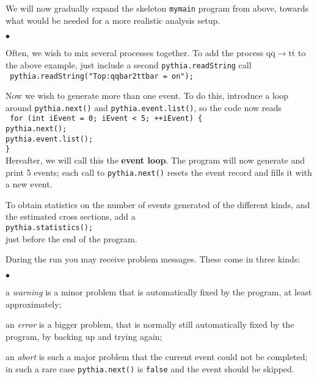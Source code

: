 \documentclass[12pt,a4paper]{article}
\newcommand{\q}{{\mathrm q}}
\renewcommand{\t}{{\mathrm t}}
\newcommand{\qbar}{\overline{\mathrm q}}
\newcommand{\tbar}{\overline{\mathrm t}}
\newenvironment{Itemize}{\begin{list}{$\bullet$}%
{\setlength{\topsep}{0.4mm}\setlength{\partopsep}{0.4mm}%
\setlength{\itemsep}{0.4mm}\setlength{\parsep}{0.4mm}}}%
{\end{list}}
\begin{document}
We will now gradually expand the skeleton \texttt{mymain} program from
above, towards what would be needed for a more realistic analysis setup.
\begin{Itemize}
\item Often, we wish to mix several processes together. 
To add the process $\q \qbar \to \t \tbar$ to the above example, 
just include a second \texttt{pythia.readString} call\\
\texttt{
\hspace*{10mm} pythia.readString("Top:qqbar2ttbar = on");
}
\item Now we wish to generate more than one event. To do this, introduce a
loop around \texttt{pythia.next()} and \texttt{pythia.event.list()}, so the
code now reads\\
\texttt{
\hspace*{10mm} for (int iEvent = 0; iEvent < 5; ++iEvent) \{ \\
\hspace*{15mm}   pythia.next(); \\
\hspace*{15mm}   pythia.event.list(); \\
\hspace*{10mm} \} } \\
Hereafter, we will call this the \textbf{event loop}. The program will
now generate and print 5 events; each call to \texttt{pythia.next()} 
resets the event record and fills it with a new event. 
\item To obtain statistics on the number of events generated of the 
different kinds, and the estimated cross sections, add a \\
\hspace*{10mm}\texttt{pythia.statistics();}\\
just before the end of the program.
\item During the run you may receive problem messages. These come in
three kinds:
\begin{Itemize}
\item a \textit{warning} is a minor problem that is automatically fixed by 
the program, at least approximately;
\item an \textit{error} is a bigger problem, that is normally still 
automatically fixed by the program, by backing up and trying again;
\item an \textit{abort} is such a major problem that the current
 event could not be completed; in such a rare case \texttt{pythia.next()} 
is \texttt{false} and the event should be skipped.  

\end{Itemize}
\end{Itemize}
\end{document}
